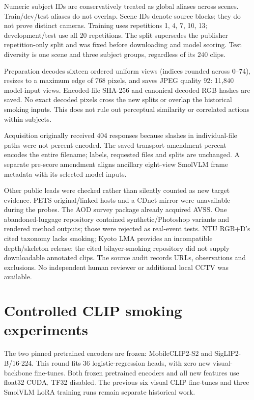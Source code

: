 \documentclass[10pt,a4paper]{article}
\begin{document}
Numeric subject IDs are conservatively treated as global aliases across scenes. Train/dev/test aliases do not overlap. Scene IDs denote source blocks; they do not prove distinct cameras. Training uses repetitions 1, 4, 7, 10, 13; development/test use all 20 repetitions. The split supersedes the publisher repetition-only split and was fixed before downloading and model scoring. Test diversity is one scene and three subject groups, regardless of its 240 clips.

Preparation decodes sixteen ordered uniform views (indices rounded across 0--74), resizes to a maximum edge of 768 pixels, and saves JPEG quality 92: 11,840 model-input views. Encoded-file SHA-256 and canonical decoded RGB hashes are saved. No exact decoded pixels cross the new splits or overlap the historical smoking inputs. This does not rule out perceptual similarity or correlated actions within subjects.

Acquisition originally received 404 responses because slashes in individual-file paths were not percent-encoded. The saved transport amendment percent-encodes the entire filename; labels, requested files and splits are unchanged. A separate pre-score amendment aligns ancillary eight-view SmolVLM frame metadata with its selected model inputs.

Other public leads were checked rather than silently counted as new target evidence. PETS original/linked hosts and a CDnet mirror were unavailable during the probes. The AOD survey package already acquired AVSS. One abandoned-luggage repository contained synthetic/Photoshop variants and rendered method outputs; those were rejected as real-event tests. NTU RGB+D's cited taxonomy lacks smoking; Kyoto LMA provides an incompatible depth/skeleton release; the cited bilayer-smoking repository did not supply downloadable annotated clips. The source audit records URLs, observations and exclusions. No independent human reviewer or additional local CCTV was available.

\section{Controlled CLIP smoking experiments}

The two pinned pretrained encoders are frozen: MobileCLIP2-S2 and SigLIP2-B/16-224. This round fits 36 logistic-regression heads, with zero new visual-backbone fine-tunes. Both frozen pretrained encoders and all new features use float32 CUDA, TF32 disabled. The previous six visual CLIP fine-tunes and three SmolVLM LoRA training runs remain separate historical work.
\end{document}
